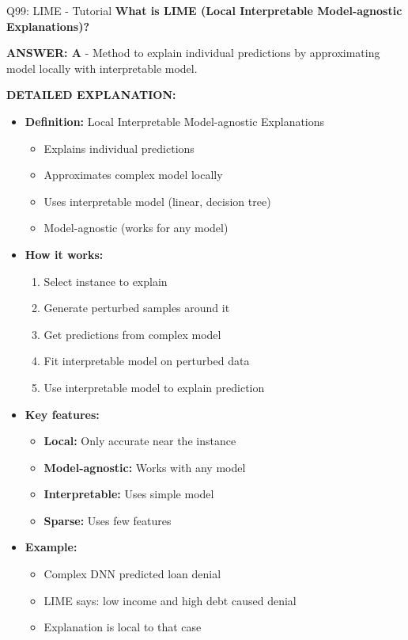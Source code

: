 \documentclass[8pt]{beamer}
\begin{document}
	\begin{frame}{Q99: LIME - Tutorial}
		\fontsize{6.5}{7.5}\selectfont
		\textbf{What is LIME (Local Interpretable Model-agnostic Explanations)?}
		
		\vspace{0.05cm}
		\textcolor{myblue}{\textbf{ANSWER: A}} - Method to explain individual predictions by approximating model locally with interpretable model.
		
		\vspace{0.05cm}
		\textbf{DETAILED EXPLANATION:}
		\begin{itemize}
			\item \textbf{Definition:} Local Interpretable Model-agnostic Explanations
			\begin{itemize}
				\item Explains individual predictions
				\item Approximates complex model locally
				\item Uses interpretable model (linear, decision tree)
				\item Model-agnostic (works for any model)
			\end{itemize}
			\item \textbf{How it works:}
			\begin{enumerate}
				\item Select instance to explain
				\item Generate perturbed samples around it
				\item Get predictions from complex model
				\item Fit interpretable model on perturbed data
				\item Use interpretable model to explain prediction
			\end{enumerate}
			\item \textbf{Key features:}
			\begin{itemize}
				\item \textbf{Local:} Only accurate near the instance
				\item \textbf{Model-agnostic:} Works with any model
				\item \textbf{Interpretable:} Uses simple model
				\item \textbf{Sparse:} Uses few features
			\end{itemize}
			\item \textbf{Example:}
			\begin{itemize}
				\item Complex DNN predicted loan denial
				\item LIME says: low income and high debt caused denial
				\item Explanation is local to that case
			\end{itemize}
		\end{itemize}
		

\end{frame}
\end{document}
